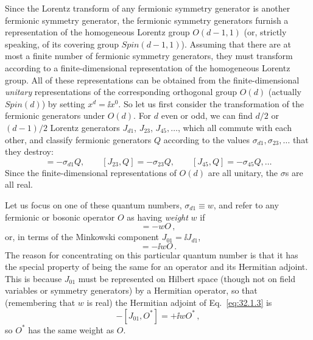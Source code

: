 Since the Lorentz transform of any fermionic symmetry generator is another
fermionic symmetry generator, the fermionic symmetry generators furnish a
representation of the homogeneous Lorentz group \(O(d-1,1)\) (or, strictly
speaking, of its covering group \(Spin(d-1,1)\)). Assuming that there are at
most a finite number of fermionic symmetry generators, they must transform
according to a finite-dimensional representation of the homogeneous Lorentz
group. All of these representations can be obtained from the
finite-dimensional \textit{unitary} representations of the corresponding
orthogonal group \(O(d)\) (actually \(Spin(d)\)) by setting \(x^d=\ii x^0\).
So let us first consider the transformation of the fermionic generators
under \(O(d)\). For \(d\) even or odd, we can find \(d/2\) or \((d-1)/2\)
Lorentz generators \(J_{d1}\), \(J_{23}\), \(J_{45},\ldots\), which all
commute with each other, and classify fermionic generators \(Q\) according
to the values \(\sigma_{d1},\sigma_{23},\ldots\) that they destroy:
\begin{equation}
  [J_{d1},Q]=-\sigma_{d1}Q,\qquad
  [J_{23},Q]=-\sigma_{23}Q,\qquad
  [J_{45},Q]=-\sigma_{45}Q,\ldots
  \tag{32.1.1}\label{eq:32.1.1}
\end{equation}
Since the finite-dimensional representations of \(O(d)\) are all unitary,
the \(\sigma\)s are all real.

Let us focus on one of these quantum numbers, \(\sigma_{d1}\equiv w\), and
refer to any fermionic or bosonic operator \(O\) as having \textit{weight}
\(w\) if
\begin{equation}
  [J_{d1},O]=-wO\,,
  \tag{32.1.2}\label{eq:32.1.2}
\end{equation}
or, in terms of the Minkowski component \(J_{01}=\ii J_{d1}\),
\begin{equation}
  [J_{01},O]=-\ii wO\,.
  \tag{32.1.3}\label{eq:32.1.3}
\end{equation}
The reason for concentrating on this particular quantum number is that it
has the special property of being the same for an operator and its Hermitian
adjoint. This is because \(J_{01}\) must be represented on Hilbert space
(though not on field variables or symmetry generators) by a Hermitian
operator, so that (remembering that \(w\) is real) the Hermitian adjoint of
Eq.~\eqref{eq:32.1.3} is
\begin{equation}
  -[J_{01},O^*]=+\ii wO^*\,,
  \tag{32.1.4}\label{eq:32.1.4}
\end{equation}
so \(O^*\) has the same weight as \(O\).

